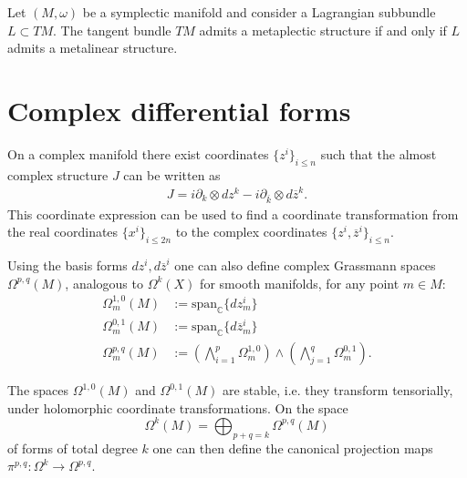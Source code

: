     \begin{property}\label{complex:metaplectic}
        Let $(M,\omega)$ be a symplectic manifold and consider a Lagrangian subbundle $L\subset TM$. The tangent bundle $TM$ admits a metaplectic structure if and only if $L$ admits a metalinear structure.
    \end{property}

\section{Complex differential forms}

    \begin{property}
        On a complex manifold there exist coordinates $\{z^i\}_{i\leq n}$ such that the almost complex structure $J$ can be written as
        \begin{gather}
            \label{complex:complex_structure}
            J = i\partial_k\otimes dz^k - i\partial_{\overline{k}}\otimes d\overline{z}^k.
        \end{gather}
        This coordinate expression can be used to find a coordinate transformation from the real coordinates $\{x^i\}_{i\leq2n}$ to the complex coordinates $\{z^i,\overline{z}^i\}_{i\leq n}$.
    \end{property}

    Using the basis forms $dz^i,d\overline{z}^i$ one can also define complex Grassmann spaces $\Omega^{p,q}(M)$, analogous to $\Omega^k(X)$ for smooth manifolds, for any point $m\in M$:
    \begin{align}
        \Omega^{1,0}_m(M) &:= \mathrm{span}_\mathbb{C}\{dz^i_m\}\\
        \Omega^{0,1}_m(M) &:= \mathrm{span}_\mathbb{C}\{d\overline{z}^i_m\}\\
        \Omega^{p,q}_m(M) &:= \left(\bigwedge_{i=1}^p\Omega^{1,0}_m\right)\wedge\left(\bigwedge_{j=1}^q\Omega^{0,1}_m\right).
    \end{align}

    \begin{property}
        The spaces $\Omega^{1,0}(M)$ and $\Omega^{0,1}(M)$ are stable, i.e. they transform tensorially, under holomorphic coordinate transformations. On the space \[\Omega^k(M) = \bigoplus_{p+q=k}\Omega^{p,q}(M)\] of forms of total degree $k$ one can then define the canonical projection maps $\pi^{p,q}:\Omega^k\rightarrow\Omega^{p,q}$.
    \end{property}

